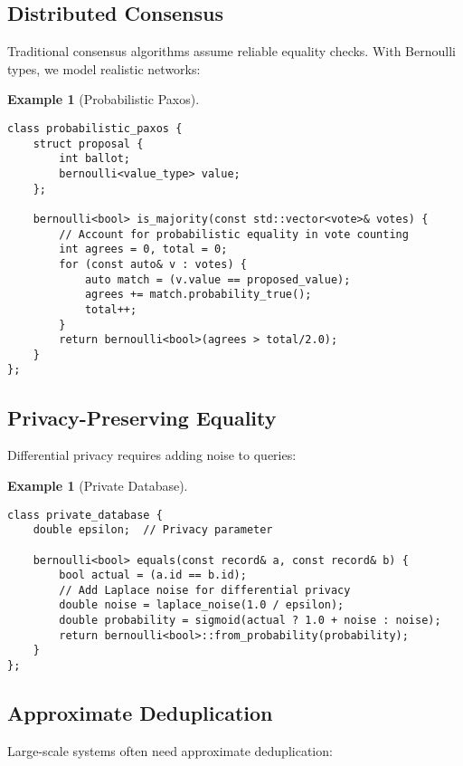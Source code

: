 \documentclass[11pt,final,hidelinks]{article}
\newtheorem{example}[theorem]{Example}
\begin{document}
\subsection{Distributed Consensus}

Traditional consensus algorithms assume reliable equality checks. With Bernoulli types, we model realistic networks:

\begin{example}[Probabilistic Paxos]
\begin{verbatim}
class probabilistic_paxos {
    struct proposal {
        int ballot;
        bernoulli<value_type> value;
    };
    
    bernoulli<bool> is_majority(const std::vector<vote>& votes) {
        // Account for probabilistic equality in vote counting
        int agrees = 0, total = 0;
        for (const auto& v : votes) {
            auto match = (v.value == proposed_value);
            agrees += match.probability_true();
            total++;
        }
        return bernoulli<bool>(agrees > total/2.0);
    }
};
\end{verbatim}
\end{example}

\subsection{Privacy-Preserving Equality}

Differential privacy requires adding noise to queries:

\begin{example}[Private Database]
\begin{verbatim}
class private_database {
    double epsilon;  // Privacy parameter
    
    bernoulli<bool> equals(const record& a, const record& b) {
        bool actual = (a.id == b.id);
        // Add Laplace noise for differential privacy
        double noise = laplace_noise(1.0 / epsilon);
        double probability = sigmoid(actual ? 1.0 + noise : noise);
        return bernoulli<bool>::from_probability(probability);
    }
};
\end{verbatim}
\end{example}

\subsection{Approximate Deduplication}

Large-scale systems often need approximate deduplication:
\end{document}
